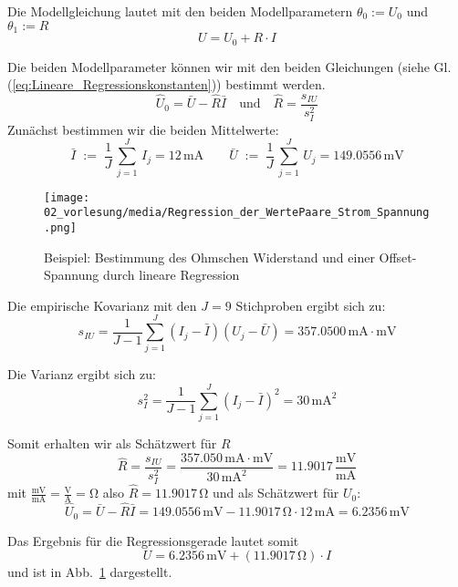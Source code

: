 Die Modellgleichung lautet mit den beiden Modellparametern
$\theta_0 :=U_0$ und $\theta_1:=R$
\begin{equation}
U = U_0 + R \cdot I
\end{equation}

Die beiden Modellparameter können wir mit den beiden Gleichungen (siehe Gl. (\ref{eq:Lineare_Regressionskonstanten})) bestimmt werden.
\begin{equation}
\hat{U}_0 = \bar {U} - \hat{R} \bar {I} \quad \mathrm{und} \quad
\hat{R} = \frac{s_{IU} }{s_I^2 }
\label{eq:Lineare_Regressionskonstanten_Widerstand}
\end{equation}
Zunächst bestimmen wir die beiden Mittelwerte:
\begin{equation}
\bar{I}\; := \; \frac{1}{J} \, \sum\limits_{j = 1}^J \, I_j
= 12 \, \mathrm{mA}
\qquad
\bar{U} \; := \; \frac{1}{J} \, \sum\limits_{j = 1}^J \, U_j
= 149.0556  \, \mathrm{mV}
\end{equation}
\begin{figure}
	\centering
	\texttt{[image: 02\_vorlesung/media/Regression\_der\_WertePaare\_Strom\_Spannung.png]}
	\caption{Beispiel: Bestimmung des Ohmschen Widerstand und einer Offset-Spannung durch lineare Regression} \label{fig:LineareRegressionWiderstand}
\end{figure}
Die empirische Kovarianz mit den $J = 9$ Stichproben ergibt sich zu:
\[
s_{IU} = \frac{1}{J - 1}\sum\limits_{j = 1}^J
(I_j - \bar {I})(U_j - \bar {U}) = 357.0500  \, \mathrm{mA} \cdot \mathrm{mV}
\]

Die Varianz ergibt sich zu:
\[
s_I^2 = \frac{1}{J - 1}\sum\limits_{j = 1}^J {(I_j - \bar {I})^2} = 30  \, \mathrm{mA}^2
\]

Somit erhalten wir als Schätzwert für $R$
\[
\hat{R} = \frac{s_{IU} }{s_I^2} = \frac{357.050 \, \mathrm{mA} \cdot \mathrm{mV}}{30 \, \mathrm{mA}^2} = 11.9017
\, \frac{\mathrm{mV}}{\mathrm{mA}}
\]
mit $\frac{\mathrm{mV}}{\mathrm{mA}} = \frac{\mathrm{V}}{\mathrm{A}} = \mathrm{\Omega}$ also $\hat{R} = 11.9017 \, \mathrm{\Omega}$
und als Schätzwert für $U_0$:
\[
\hat{U}_0 = \bar {U} - \hat{R} \bar {I} = 149.0556 \, \mathrm{mV}-  11.9017  \, \mathrm{\Omega} \cdot 12 \, \mathrm{mA} =
6.2356 \, \mathrm{mV}
\]

Das Ergebnis für die Regressionsgerade lautet somit
\begin{equation}
U = 6.2356  \, \mathrm{mV} + (11.9017 \, \mathrm{\Omega}) \cdot I
\end{equation}
 und ist in Abb.~\ref*{fig:LineareRegressionWiderstand} dargestellt.

